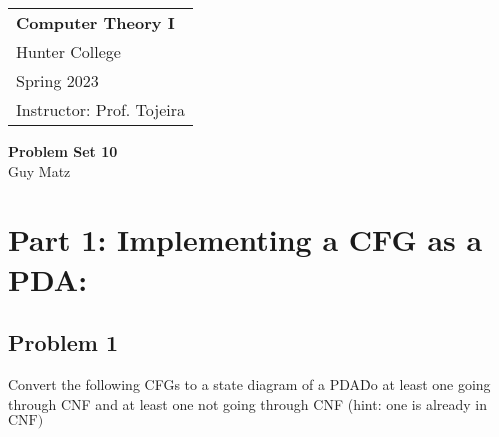 \documentclass[12pt]{scrbook}
\author{Guy Matz}
\begin{document}

  \begin{tabular}{p{15.5cm}}
    {\large \textbf{Computer Theory I}} \\
    Hunter College \\
    Spring 2023  \\
    Instructor: Prof. Tojeira\\
    \hline
  \end{tabular}

  \begin{center}
    {\Large \textbf{Problem Set 10}}
    \vspace{2mm}\\
    Guy Matz
  \end{center}

\section*{Part 1: Implementing a CFG as a PDA:}
\vspace{0.4cm}
\subsection*{Problem 1} Convert the following CFGs to a state diagram of a
PDA\. Do at least one going through CNF and at least one not going through CNF
(hint: one is already in $\mathrm{CNF})$
\end{document}
